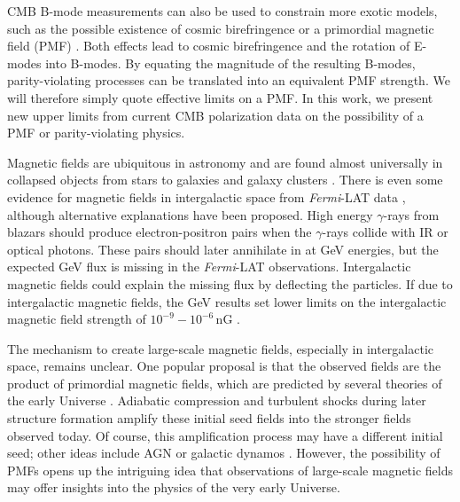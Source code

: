 \documentclass[apj]{emulateapj}
\newcommand{\fermilat}{\textit{Fermi}-LAT}
\begin{document}
CMB B-mode measurements can also be used to constrain more exotic models, such as the possible existence of cosmic birefringence \citep{carroll98,lue99} or a primordial magnetic field (PMF) \citep{kosowsky96, seshadri01}.  
Both effects lead to cosmic birefringence and the rotation of E-modes into B-modes. 
By equating the magnitude of the resulting B-modes, parity-violating processes can be translated into an equivalent PMF strength. 
We will therefore simply quote effective limits on a PMF. 
In this work, we present new upper limits from current CMB polarization data on the possibility of a PMF or parity-violating physics. 

Magnetic fields are ubiquitous in astronomy and are found almost universally in collapsed objects from stars to galaxies and galaxy clusters \citep[for review, see][]{ryu12, widrow12}. 
There is even some evidence for magnetic fields in intergalactic space from \fermilat{} data \citep{neronov10}, although alternative explanations \citep{broderick12} have been proposed. 
High energy $\gamma$-rays from blazars should  produce electron-positron pairs when the $\gamma$-rays collide with IR or optical photons. 
These pairs should later annihilate in at GeV energies, but the expected GeV flux is missing in the \fermilat{} observations. 
Intergalactic magnetic fields could explain the missing flux by deflecting the particles. 
If due to intergalactic magnetic fields, the GeV results set lower limits on the intergalactic magnetic field strength of $10^{-9} - 10^{-6}$\,nG \citep{tavecchio10,taylor11,dermer11,vovk12}. 

The mechanism to create large-scale magnetic fields, especially in intergalactic space, remains unclear. 
One popular proposal is that the observed fields are the product of primordial magnetic fields, which are predicted by several theories of the early Universe \citep[e.g.,][]{turner88, grasso98,ichiki06}. 
Adiabatic compression and turbulent shocks during later structure formation amplify these initial seed fields into the stronger fields observed today. 
Of course, this amplification process may have a different initial seed; other ideas include AGN or galactic dynamos \citep[for a review, see][]{giovannini04}. 
However, the possibility of PMFs opens up the intriguing idea that observations of large-scale magnetic fields may offer insights into the physics of the very early Universe. 
\end{document}

